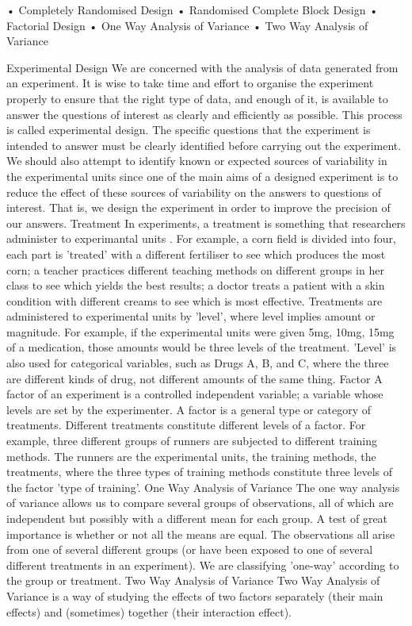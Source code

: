 \begin{itemize}
•	Completely Randomised Design
•	Randomised Complete Block Design
•	Factorial Design
•	One Way Analysis of Variance
•	Two Way Analysis of Variance
 
Experimental Design 
We are concerned with the analysis of data generated from an experiment. It is wise to take time and effort to organise the experiment properly to ensure that the right type of data, and enough of it, is available to answer the questions of interest as clearly and efficiently as possible. This process is called experimental design.
The specific questions that the experiment is intended to answer must be clearly identified before carrying out the experiment. We should also attempt to identify known or expected sources of variability in the experimental units since one of the main aims of a designed experiment is to reduce the effect of these sources of variability on the answers to questions of interest. That is, we design the experiment in order to improve the precision of our answers.
Treatment 
In experiments, a treatment is something that researchers administer to experimantal units . For example, a corn field is divided into four, each part is 'treated' with a different fertiliser to see which produces the most corn; a teacher practices different teaching methods on different groups in her class to see which yields the best results; a doctor treats a patient with a skin condition with different creams to see which is most effective.
Treatments are administered to experimental units by 'level', where level implies amount or magnitude. For example, if the experimental units were given 5mg, 10mg, 15mg of a medication, those amounts would be three levels of the treatment. 'Level' is also used for categorical variables, such as Drugs A, B, and C, where the three are different kinds of drug, not different amounts of the same thing.
Factor 
A factor of an experiment is a controlled independent variable; a variable whose levels are set by the experimenter.
A factor is a general type or category of treatments. Different treatments constitute different levels of a factor. For example, three different groups of runners are subjected to different training methods. The runners are the experimental units, the training methods, the treatments, where the three types of training methods constitute three levels of the factor 'type of training'.
One Way Analysis of Variance 
The one way analysis of variance allows us to compare several groups of observations, all of which are independent but possibly with a different mean for each group. A test of great importance is whether or not all the means are equal.
The observations all arise from one of several different groups (or have been exposed to one of several different treatments in an experiment). We are classifying 'one-way' according to the group or treatment.
Two Way Analysis of Variance 
Two Way Analysis of Variance is a way of studying the effects of two factors separately (their main effects) and (sometimes) together (their interaction effect).


\end{itemize}
